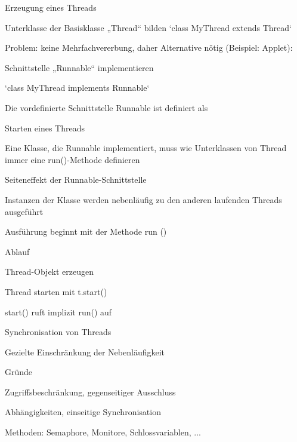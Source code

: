 \documentclass[a4paper]{article}
\begin{document}
\begin{multicols}{3}
  Erzeugung eines Threads
  \begin{itemize*}
    \item Unterklasse der Basisklasse „Thread“ bilden `class MyThread extends Thread`
    \item Problem: keine Mehrfachvererbung, daher Alternative nötig (Beispiel: Applet):
          \begin{itemize*}
            \item Schnittstelle „Runnable“ implementieren
            \item `class MyThread implements Runnable`
          \end{itemize*}
    \item Die vordefinierte Schnittstelle Runnable ist definiert als
  \end{itemize*}

  Starten eines Threads
  \begin{itemize*}
    \item Eine Klasse, die Runnable implementiert, muss wie Unterklassen von Thread immer eine run()-Methode definieren
    \item Seiteneffekt der Runnable-Schnittstelle
          \begin{itemize*}
            \item Instanzen der Klasse werden nebenläufig zu den anderen laufenden Threads ausgeführt
            \item Ausführung beginnt mit der Methode run ()
          \end{itemize*}
    \item Ablauf
          \begin{itemize*}
            \item Thread-Objekt erzeugen
            \item Thread starten mit t.start()
            \item start() ruft implizit run() auf
          \end{itemize*}
  \end{itemize*}

  Synchronisation von Threads
  \begin{itemize*}
    \item Gezielte Einschränkung der Nebenläufigkeit
    \item Gründe
          \begin{itemize*}
            \item Zugriffsbeschränkung, gegenseitiger Ausschluss
            \item Abhängigkeiten, einseitige Synchronisation
          \end{itemize*}
    \item Methoden: Semaphore, Monitore, Schlossvariablen, ...
  \end{itemize*}


\end{multicols}
\end{document}
